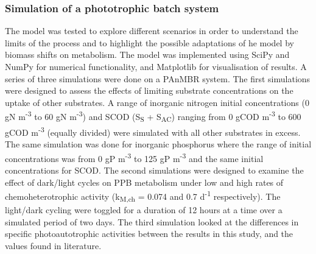 \subsubsection{Simulation of a phototrophic batch system}
The model was tested to explore different scenarios in order to understand the limits of the process and to highlight the possible adaptations of he model by biomass shifts on metabolism. The model was implemented using SciPy \cite{jones2001} and NumPy \cite{walt2011} for numerical functionality, and Matplotlib \cite{hunter2007} for visualisation of results. A series of three simulations were done on a PAnMBR system.
\skippingparagraph
The first simulations were designed to assess the effects of limiting substrate concentrations on the uptake of other substrates. A range of inorganic nitrogen initial concentrations (0 gN m\textsuperscript{-3} to 60 gN m\textsuperscript{-3}) and SCOD (S\textsubscript{S} + S\textsubscript{AC}) ranging from 0 gCOD m\textsuperscript{-3} to 600 gCOD m\textsuperscript{-3} (equally divided) were simulated with all other substrates in excess. The same simulation was done for inorganic phosphorus where the range of initial concentrations was from 0 gP m\textsuperscript{-3} to 125 gP m\textsuperscript{-3} and the same initial concentrations for SCOD. 
\skippingparagraph
The second simulations were designed to examine the effect of dark/light cycles on PPB metabolism under low and high rates of chemoheterotrophic activity (k\textsubscript{M,ch} = 0.074 and 0.7 d\textsuperscript{-1} respectively). The light/dark cycling were toggled for a duration of 12 hours at a time over a simulated period of two days. 
\skippingparagraph
The third simulation looked at the differences in specific photoautotrophic activities between the results in this study, and the values found in literature.



